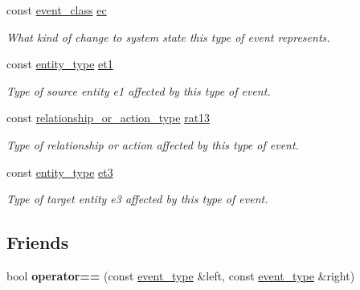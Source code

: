 \begin{DoxyCompactItemize}
\item 
\mbox{\label{structtricl_1_1event__type_a19e2bce4d3ba86cd149ac443e6189a21}} 
const \hyperlink{namespacetricl_a6967089e2c0837f273d8cb5fd9f7e46d}{event\+\_\+class} \hyperlink{structtricl_1_1event__type_a19e2bce4d3ba86cd149ac443e6189a21}{ec}
\begin{DoxyCompactList}\small\item\em What kind of change to system state this type of event represents. \end{DoxyCompactList}\item 
\mbox{\label{structtricl_1_1event__type_ae1b97b7244cfc3edb110fc597695c184}} 
const \hyperlink{namespacetricl_afd4de3aedd5e48cf955f03457386e98f}{entity\+\_\+type} \hyperlink{structtricl_1_1event__type_ae1b97b7244cfc3edb110fc597695c184}{et1}
\begin{DoxyCompactList}\small\item\em Type of source entity e1 affected by this type of event. \end{DoxyCompactList}\item 
\mbox{\label{structtricl_1_1event__type_a12e8607ea565fb26c5392417bf4a34e9}} 
const \hyperlink{namespacetricl_a2d01894944fb58a8fedc0912a48d13f8}{relationship\+\_\+or\+\_\+action\+\_\+type} \hyperlink{structtricl_1_1event__type_a12e8607ea565fb26c5392417bf4a34e9}{rat13}
\begin{DoxyCompactList}\small\item\em Type of relationship or action affected by this type of event. \end{DoxyCompactList}\item 
\mbox{\label{structtricl_1_1event__type_a6357a3b67f24559c66158260099f8847}} 
const \hyperlink{namespacetricl_afd4de3aedd5e48cf955f03457386e98f}{entity\+\_\+type} \hyperlink{structtricl_1_1event__type_a6357a3b67f24559c66158260099f8847}{et3}
\begin{DoxyCompactList}\small\item\em Type of target entity e3 affected by this type of event. \end{DoxyCompactList}\end{DoxyCompactItemize}
\subsection*{Friends}
\begin{DoxyCompactItemize}
\item 
\mbox{\label{structtricl_1_1event__type_ac6ea5340a97cf343356e390f082881de}} 
bool {\bfseries operator==} (const \hyperlink{structtricl_1_1event__type}{event\+\_\+type} \&left, const \hyperlink{structtricl_1_1event__type}{event\+\_\+type} \&right)
\end{DoxyCompactItemize}


